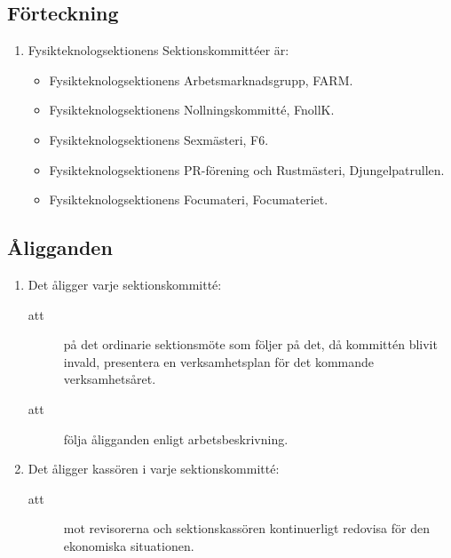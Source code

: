 \documentclass[11pt,a4paper]{article}
\begin{document}
\subsection{Förteckning}

\begin{enumerate}[\thesubsection .1]
  \item Fysikteknologsektionens Sektionskommittéer är:
    \begin{itemize}
      \item Fysikteknologsektionens Arbetsmarknadsgrupp, FARM.
      \item Fysikteknologsektionens Nollningskommitté, FnollK.
      \item Fysikteknologsektionens Sexmästeri, F6.
      \item Fysikteknologsektionens PR-förening och Rustmästeri, Djungelpatrullen.
      \item Fysikteknologsektionens Focumateri, Focumateriet. 
    \end{itemize}
\end{enumerate}

\subsection{Åligganden}

\begin{enumerate}[\thesubsection .1]

  \item Det åligger varje sektionskommitté:
    \begin{description}
    \item[att] på det ordinarie sektionsmöte som följer på det, då kommittén blivit invald, presentera en verksamhetsplan för det kommande verksamhetsåret.     
     \item[att] följa åligganden enligt arbetsbeskrivning. 
    \end{description}


  \item Det åligger kassören i varje sektionskommitté:
    \begin{description}
      \item[att]  mot revisorerna och sektionskassören kontinuerligt redovisa för den ekonomiska situationen.
       \end{description}
\end{enumerate}
\end{document}
